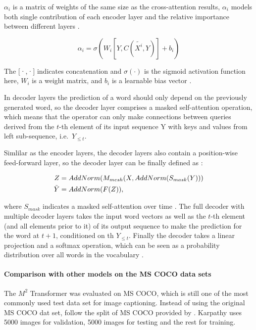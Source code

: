 \documentclass[
]{krantz}
\begin{document}
\(\alpha_i\) is a matrix of weights of the same size as the cross-attention results, \(\alpha_i\) models both single contribution of each encoder layer and the relative importance between different layers \citep{cornia2020m2}.

\begin{equation}
\alpha_i = \sigma(W_i [Y,C(\tilde{X^i}, Y)]+ b_i)
\end{equation}

The {[}·,·{]} indicates concatenation and \(\sigma(·)\) is the sigmoid activation function here, \(W_i\) is a weight matrix, and \(b_i\) is a learnable bias vector \citep{cornia2020m2}.

In decoder layers the prediction of a word should only depend on the previously generated word, so the decoder layer comprises a masked self-attention operation, which means that the operator can only make connections between queries derived from the \(t\)-th element of its input sequence Y with keys and values from left sub-sequence, i.e.~\(Y_{≤t}\).

Simlilar as the encoder layers, the decoder layers also contain a position-wise feed-forward layer, so the decoder layer can be finally defined as \citep{cornia2020m2}:

\begin{align}
Z &= AddNorm(M_{mesh}(X,AddNorm(S_{mask}(Y ))) \notag \\
\tilde{Y} &= AddNorm(F(Z)),
\end{align}

where \(S_{mask}\) indicates a masked self-attention over time \citep{cornia2020m2}.
The full decoder with multiple decoder layers takes the input word vectors as well as the \(t\)-th element (and all elements prior to it) of its output sequence to make the prediction for the word at \(t + 1\), conditioned on th \(Y_{≤t}\). Finally the decoder takes a linear projection and a softmax operation, which can be seen as a probability distribution over all words in the vocabulary \citep{cornia2020m2}.

\hypertarget{comparison-with-other-models-on-the-ms-coco-data-sets}{%
\paragraph{Comparison with other models on the MS COCO data sets}\label{comparison-with-other-models-on-the-ms-coco-data-sets}}

The \(M^2\) Transformer was evaluated on MS COCO, which is still one of the most commonly used test data set for image captioning. Instead of using the original MS COCO dat set, \citet{cornia2020m2} follow the split of MS COCO provided by \citet{karpthy1}. Karpathy uses 5000 images for validation, 5000 images for testing and the rest for training.
\end{document}
